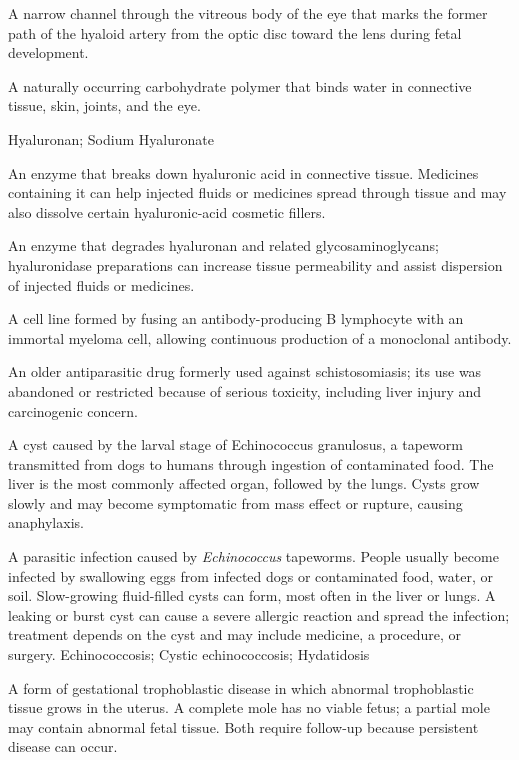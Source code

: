  A narrow channel through the vitreous body of the eye that marks the former path of the hyaloid artery from the optic disc toward the lens during fetal development.

 A naturally occurring carbohydrate polymer that binds water in connective tissue, skin, joints, and the eye.

\synonyms
Hyaluronan; Sodium Hyaluronate

 An enzyme that breaks down hyaluronic acid in connective tissue. Medicines containing it can help injected fluids or medicines spread through tissue and may also dissolve certain hyaluronic-acid cosmetic fillers.

 An enzyme that degrades hyaluronan and related glycosaminoglycans; hyaluronidase preparations can increase tissue permeability and assist dispersion of injected fluids or medicines.

 A cell line formed by fusing an antibody-producing B lymphocyte with an immortal myeloma cell, allowing continuous production of a monoclonal antibody.

 An older antiparasitic drug formerly used against schistosomiasis; its use was abandoned or restricted because of serious toxicity, including liver injury and carcinogenic concern.

 A cyst caused by the larval stage of Echinococcus granulosus, a tapeworm transmitted
from dogs to humans through ingestion of contaminated food. The liver is the most
commonly affected organ, followed by the lungs. Cysts grow slowly and may become
symptomatic from mass effect or rupture, causing anaphylaxis.

 A parasitic infection caused by \textit{Echinococcus} tapeworms. People usually become infected by swallowing eggs from infected dogs or contaminated food, water, or soil. Slow-growing fluid-filled cysts can form, most often in the liver or lungs. A leaking or burst cyst can cause a severe allergic reaction and spread the infection; treatment depends on the cyst and may include medicine, a procedure, or surgery.
\synonyms
Echinococcosis; Cystic echinococcosis; Hydatidosis

 A form of gestational trophoblastic disease in which abnormal trophoblastic tissue grows in
the uterus. A complete mole has no viable fetus; a partial mole may contain abnormal fetal tissue. Both require follow-up
because persistent disease can occur.

